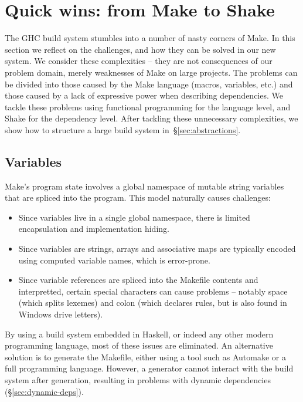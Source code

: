 \section{Quick wins: from Make to Shake\label{sec:solutions}}

The GHC build system stumbles into a number of nasty corners of Make. In this
section we reflect on the challenges, and how they can be solved in
our new system. We consider these  complexities --
they are not consequences of our problem domain, merely weaknesses of Make on
large projects. The problems can be divided into those caused by the
Make language (macros, variables, etc.) and those caused by a lack of expressive
power when describing dependencies. We tackle these problems using
functional programming for the language level, and Shake for the dependency
level. After tackling these unnecessary complexities, we show how to structure a
large build system in~\S\ref{sec:abstractions}.

\subsection{Variables}

Make's program state involves a global namespace of mutable string variables that are
spliced into the program. This model naturally causes challenges:

\begin{itemize}
\item Since variables live in a single global namespace, there is limited
encapsulation and implementation hiding.
\item Since variables are strings, arrays and associative maps are typically
encoded using computed variable names, which is error-prone.
\item Since variable references are spliced into the Makefile contents
and interpretted, certain special characters can cause problems --
notably space (which splits lexemes) and colon (which declares rules, but is
also found in Windows drive letters).
\end{itemize}

By using a build system embedded in Haskell, or indeed any other modern programming language,
most of these issues are eliminated. An alternative solution is to generate the Makefile, either using a tool such as Automake or a full programming language. However, a generator cannot interact with the
build system after generation, resulting in problems with dynamic dependencies
(\S\ref{sec:dynamic-deps}).

